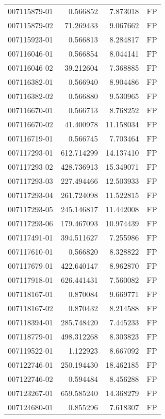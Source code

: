\begin{tabular}{lrrl}
007115879-01 &    0.566852 &     7.873018 &   FP \\
007115879-02 &   71.269433 &     9.067662 &   FP \\
007115923-01 &    0.566813 &     8.284817 &   FP \\
007116046-01 &    0.566854 &     8.044141 &   FP \\
007116046-02 &   39.212604 &     7.368885 &   FP \\
007116382-01 &    0.566940 &     8.904486 &   FP \\
007116382-02 &    0.566880 &     9.530965 &   FP \\
007116670-01 &    0.566713 &     8.768252 &   FP \\
007116670-02 &   41.400978 &    11.158034 &   FP \\
007116719-01 &    0.566745 &     7.703464 &   FP \\
007117293-01 &  612.714299 &    14.137410 &   FP \\
007117293-02 &  428.736913 &    15.349071 &   FP \\
007117293-03 &  227.494466 &    12.503933 &   FP \\
007117293-04 &  261.724098 &    11.522815 &   FP \\
007117293-05 &  245.146817 &    11.442008 &   FP \\
007117293-06 &  179.467093 &    10.974439 &   FP \\
007117491-01 &  394.511627 &     7.255986 &   FP \\
007117610-01 &    0.566820 &     8.328822 &   FP \\
007117679-01 &  422.640147 &     8.962870 &   FP \\
007117918-01 &  626.441431 &     7.560082 &   FP \\
007118167-01 &    0.870084 &     9.669771 &   FP \\
007118167-02 &    0.870432 &     8.214588 &   FP \\
007118394-01 &  285.748420 &     7.445233 &   FP \\
007118779-01 &  498.312268 &     8.303823 &   FP \\
007119522-01 &    1.122923 &     8.667092 &   FP \\
007122746-01 &  250.194430 &    18.462185 &   FP \\
007122746-02 &    0.594484 &     8.456288 &   FP \\
007123267-01 &  659.585240 &    14.368279 &   FP \\
007124680-01 &    0.855296 &     7.618307 &   FP \\

\end{tabular}
